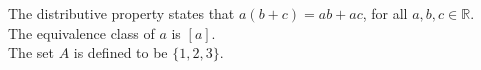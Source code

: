 \documentclass[11pt]{article}
\begin{document}
The distributive property states that $a(b+c)=ab+ac$, for all $a, b, c \in \mathbb{R}$. \\[6pt]
The equivalence class of $a$ is $[a]$. \\[6pt]
The set $A$ is defined to be $\{1, 2, 3\}$.
\end{document}
